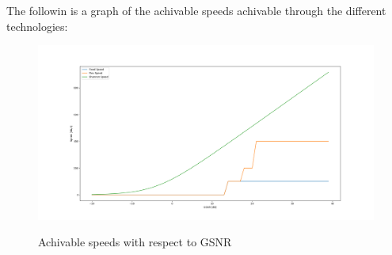 \documentclass{beamer}
\begin{document}
	\begin{frame}
		The followin is a graph of the achivable speeds achivable through the different technologies:
		\begin{figure}[h]
			\centering
			\includegraphics[width=0.9\linewidth]{Pictures/speeds achivable.png}
			\label{fig:trans_speed}
			\caption{Achivable speeds with respect to GSNR}
		\end{figure}
	\end{frame}
\end{document}
